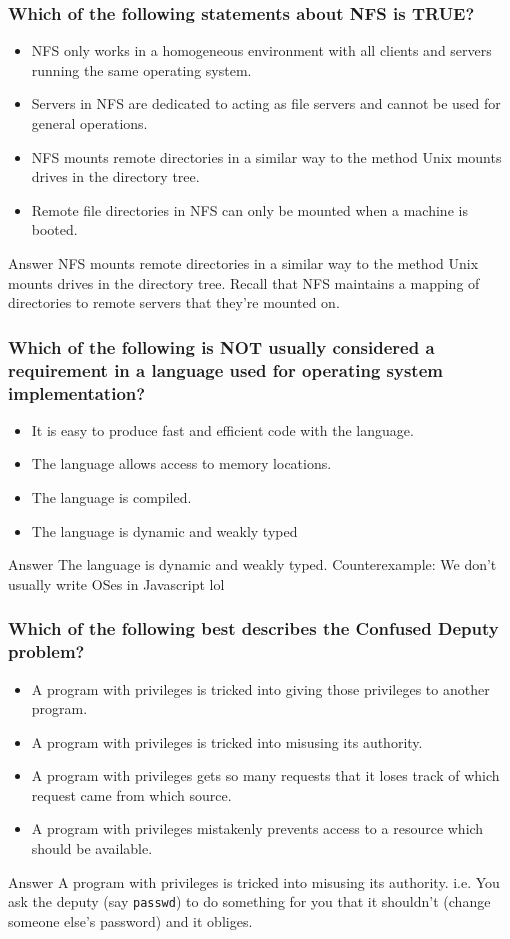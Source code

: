 \documentclass{beamer}
\begin{document}
\begin{frame}
  \frametitle{Which of the following statements about NFS is TRUE?}
  \begin{itemize}
    \item NFS only works in a homogeneous environment with all clients and servers running the same operating system.
    \item Servers in NFS are dedicated to acting as file servers and cannot be used for general operations.
    \item NFS mounts remote directories in a similar way to the method Unix mounts drives in the directory tree.
    \item Remote file directories in NFS can only be mounted when a machine is booted.
  \end{itemize}
  \pause
  \begin{block}{Answer}
    NFS mounts remote directories in a similar way to the method Unix mounts drives in the directory tree. Recall that NFS maintains a mapping of directories to remote servers that they're mounted on.
  \end{block}
\end{frame}
\begin{frame}
  \frametitle{Which of the following is NOT usually considered a requirement in a language used for operating system implementation?}
  \begin{itemize}
    \item It is easy to produce fast and efficient code with the language.
    \item The language allows access to memory locations.
    \item The language is compiled.
    \item The language is dynamic and weakly typed
  \end{itemize}
  \pause
  \begin{block}{Answer}
    The language is dynamic and weakly typed. Counterexample: We don't usually write OSes in Javascript lol
  \end{block}
\end{frame}
\begin{frame}
  \frametitle{Which of the following best describes the Confused Deputy problem?}
  \begin{itemize}
    \item A program with privileges is tricked into giving those privileges to another program.
    \item A program with privileges is tricked into misusing its authority.
    \item A program with privileges gets so many requests that it loses track of which request came from which source.
    \item A program with privileges mistakenly prevents access to a resource which should be available. 
  \end{itemize}
  \pause
  \begin{block}{Answer}
    A program with privileges is tricked into misusing its authority. i.e. You ask the deputy (say \texttt{passwd}) to do something for you that it shouldn't (change someone else's password) and it obliges.
  \end{block}
\end{frame}
\end{document}
